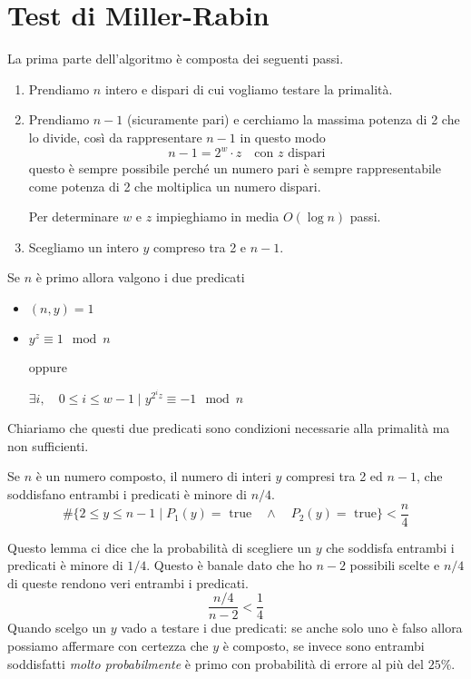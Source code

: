 \section{Test di Miller-Rabin}\label{Miller_Rabin}
La prima parte dell'algoritmo \`e composta dei seguenti passi.
\begin{enumerate}
	\item Prendiamo $n$ intero e dispari di cui vogliamo testare la primalit\`a.
	\item Prendiamo $n-1$ (sicuramente pari) e cerchiamo la massima potenza di 2 che lo divide, cos\`i da rappresentare
	      $n-1$ in questo modo
	      \[ n-1 = 2^w \cdot z \quad \text{con $z$ dispari} \]
	      questo \`e sempre possibile perch\'e un numero pari \`e sempre rappresentabile come potenza di 2 che moltiplica
	      un numero dispari.

	      Per determinare $w$ e $z$ impieghiamo in media $O(\log n)$ passi.
	\item Scegliamo un intero $y$ compreso tra 2 e $n-1$.
\end{enumerate}
Se $n$ \`e primo allora valgono i due predicati
\begin{itemize}
	\item $(n, y) = 1$
	\item $y^z \equiv 1 \mod{n}$

	      oppure

	      $\exists i, \quad 0 \leq i \leq w-1 \mid y^{2^i z} \equiv -1 \mod{n}$
\end{itemize}
Chiariamo che questi due predicati sono condizioni necessarie alla primalit\`a ma non sufficienti.

\begin{lemma}
	Se $n$ \`e un numero composto, il numero di interi $y$ compresi tra 2 ed $n-1$, che soddisfano entrambi i predicati
	\`e minore di $n / 4$.
	\[ \# \{ 2 \leq y \leq n-1 \mid P_1(y) = \text{ true} \quad \wedge \quad P_2(y) = \text{ true} \} < \frac{n}{4} \]
\end{lemma}
Questo lemma ci dice che la probabilit\`a di scegliere un $y$ che soddisfa entrambi i predicati \`e minore di $1 / 4$.
Questo \`e banale dato che ho $n - 2$ possibili scelte e $n / 4$ di queste rendono veri entrambi i predicati.
\[ \frac{n/4}{n-2} < \frac{1}{4} \]
Quando scelgo un $y$ vado a testare i due predicati: se anche solo uno \`e falso allora possiamo affermare con certezza
che $y$ \`e composto, se invece sono entrambi soddisfatti \emph{molto probabilmente} \`e primo con probabilit\`a di
errore al pi\`u del $25\%$.


